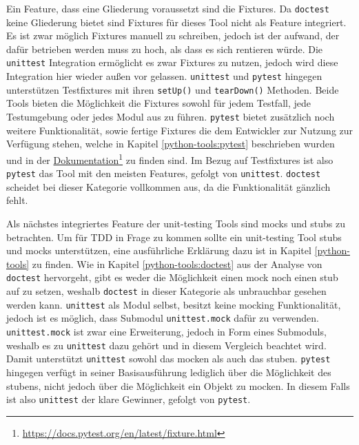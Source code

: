 Ein Feature, dass eine Gliederung voraussetzt sind die Fixtures. Da
\lstinline{doctest} keine Gliederung bietet sind Fixtures für dieses Tool
nicht als Feature integriert. Es ist zwar möglich Fixtures manuell zu
schreiben, jedoch ist der aufwand, der dafür betrieben werden muss zu hoch, als
dass es sich rentieren würde. Die \lstinline{unittest} Integration ermöglicht es
zwar Fixtures zu nutzen, jedoch wird diese Integration hier wieder außen vor
gelassen. \lstinline{unittest} und \lstinline{pytest} hingegen unterstützen
Testfixtures mit ihren \lstinline{setUp()} und \lstinline{tearDown()} Methoden.
Beide Tools bieten die Möglichkeit die Fixtures sowohl für jedem Testfall, jede
Testumgebung oder jedes Modul aus zu führen. \lstinline{pytest} bietet
zusätzlich noch weitere Funktionalität, sowie fertige Fixtures die dem
Entwickler zur Nutzung zur Verfügung stehen, welche in Kapitel
\ref{python-tools:pytest} beschrieben wurden und in der
\href{https://docs.pytest.org/en/latest/fixture.html}{Dokumentation}\footnote{\url{https://docs.pytest.org/en/latest/fixture.html}}
zu finden sind. Im Bezug auf Testfixtures ist also \lstinline{pytest} das Tool
mit den meisten Features, gefolgt von \lstinline{unittest}. \lstinline{doctest}
scheidet bei dieser Kategorie vollkommen aus, da die Funktionalität gänzlich
fehlt.

Als nächstes integriertes Feature der unit-testing Tools sind \Glspl{mock} und
\Glspl{stub} zu betrachten. Um für TDD in Frage zu kommen sollte ein
unit-testing Tool \Glspl{stub} und \Glspl{mock} unterstützen, eine ausführliche
Erklärung dazu ist in Kapitel \ref{python-tools} zu finden. Wie in Kapitel
\ref{python-tools:doctest} aus der Analyse von \lstinline{doctest} hervorgeht,
gibt es weder die Möglichkeit einen \Gls{mock} noch einen \Gls{stub} auf zu
setzen, weshalb \lstinline{doctest} in dieser Kategorie als unbrauchbar gesehen
werden kann. \lstinline{unittest} als Modul selbst, besitzt keine \gls{mock}ing
Funktionalität, jedoch ist es möglich, dass Submodul \lstinline{unittest.mock}
dafür zu verwenden. \lstinline{unittest.mock} ist zwar eine Erweiterung, jedoch
in Form eines Submoduls, weshalb es zu \lstinline{unittest} dazu gehört und in
diesem Vergleich beachtet wird. Damit unterstützt \lstinline{unittest} sowohl
das \gls{mock}en als auch das \gls{stub}en. \lstinline{pytest} hingegen verfügt
in seiner Basisausführung lediglich über die Möglichkeit des \gls{stub}ens,
nicht jedoch über die Möglichkeit ein Objekt zu \gls{mock}en. In diesem Falls
ist also \lstinline{unittest} der klare Gewinner, gefolgt von
\lstinline{pytest}.
\newline

